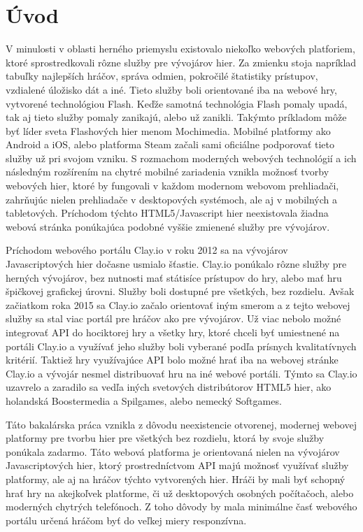
\chapter{Úvod}
\label{chap:uvod}
V minulosti v oblasti herného priemyslu existovalo niekoľko webových platforiem, ktoré sprostredkovali rôzne služby pre vývojárov hier. Za zmienku stoja napríklad tabuľky najlepších hráčov, správa odmien, pokročilé štatistiky prístupov, vzdialené úložisko dát a iné. Tieto služby boli orientované iba na webové hry, vytvorené technológiou Flash. Keďže samotná technológia Flash pomaly upadá, tak aj tieto služby pomaly zanikajú, alebo už zanikli. Takýmto príkladom môže byť líder sveta Flashových hier menom Mochimedia. Mobilné platformy ako Android a iOS, alebo platforma Steam začali sami oficiálne podporovať tieto služby už pri svojom vzniku. S rozmachom moderných webových technológií a ich následným rozšírením na chytré mobilné zariadenia vznikla možnosť tvorby webových hier, ktoré by fungovali v každom modernom webovom prehliadači, zahrňujúc nielen prehliadače v desktopových systémoch, ale aj v mobilných a tabletových.  Príchodom týchto HTML5/Javascript hier neexistovala žiadna webová stránka ponúkajúca podobné vyššie zmienené služby pre vývojárov. 

Príchodom webového portálu Clay.io v roku 2012 sa na vývojárov Javascriptových hier dočasne usmialo šťastie. Clay.io ponúkalo rôzne služby pre herných vývojárov, bez nutnosti mať státisíce prístupov do hry, alebo mať hru špičkovej grafickej úrovni. Služby boli dostupné pre všetkých, bez rozdielu. Avšak začiatkom roka 2015 sa Clay.io začalo orientovať iným smerom a z tejto webovej služby sa stal viac portál pre hráčov ako pre vývojárov. Už viac nebolo možné integrovať API do hociktorej hry a všetky hry, ktoré chceli byť umiestnené na portáli Clay.io a využívať jeho služby boli vyberané podľa prísnych kvalitatívnych kritérií. Taktiež hry využívajúce API bolo možné hrať iba na webovej stránke Clay.io a vývojár nesmel distribuovať hru na iné webové portáli. Týmto sa Clay.io uzavrelo a zaradilo sa vedľa iných svetových distribútorov HTML5 hier, ako holandská Boostermedia a Spilgames, alebo nemecký Softgames.

Táto bakalárska práca vznikla z dôvodu neexistencie otvorenej, modernej webovej platformy pre tvorbu hier pre všetkých bez rozdielu, ktorá by svoje služby ponúkala zadarmo. Táto webová platforma je orientovaná nielen na vývojárov Javascriptových hier, ktorý prostredníctvom API majú možnosť využívať služby platformy, ale aj na hráčov týchto vytvorených hier. Hráči by mali byť schopný hrať hry na akejkoľvek platforme, či už desktopových osobných počítačoch, alebo moderných chytrých telefónoch. Z toho dôvody by mala minimálne časť webového portálu určená hráčom byť do veľkej miery responzívna.


